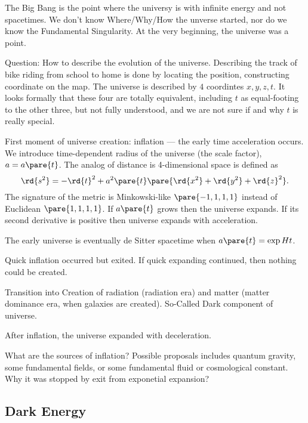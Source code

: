 \documentclass{ctexart}
\begin{document}
The Big Bang is the point where the universy is with infinite energy and not spacetimes. We don't know Where/Why/How the unverse started, nor do we know the Fundamental Singularity. At the very beginning, the universe was a point.
\par
Question: How to describe the evolution of the universe. Describing the track of bike riding from school to home is done by locating the position, constructing coordinate on the map. The universe is described by $4$ coordintes $x,y,z,t$. It looks formally that these four are totally equivalent, including $t$ as equal-footing to the other three, but not fully understood, and we are not sure if and why $t$ is really special.
\par
First moment of universe creation: inflation --- the early time acceleration occurs. We introduce time-dependent radius of the universe (the scale factor), $a=a\pare{t}$. The analog of distance is 4-dimensional space is defined as
\[ \rd{s^2} = -\rd{t}^2 + a^2\pare{t}\pare{\rd{x^2} + \rd{y^2} + \rd{z}^2}. \]
The signature of the metric is Minkowski-like $\pare{-1,1,1,1}$ instead of Euclidean $\pare{1,1,1,1}$. If $a\pare{t}$ grows then the universe expands. If its second derivative is positive then universe expands with acceleration.
\begin{cenum}
    \item The early universe is eventually de Sitter spacetime when $a\pare{t} = \exp Ht$.
    \item Quick inflation occurred but exited. If quick expanding continued, then nothing could be created.
    \item Transition into Creation of radiation (radiation era) and matter (matter dominance era, when galaxies are created). So-Called Dark component of universe.
    \item After inflation, the universe expanded with deceleration.
\end{cenum}
What are the sources of inflation? Possible proposals includes quantum gravity, some fundamental fields, or some fundamental fluid or cosmological constant. Why it was stopped by exit from exponetial expansion?

\subsection{Dark Energy} %
\label{sub:dark_energy}
\end{document}
